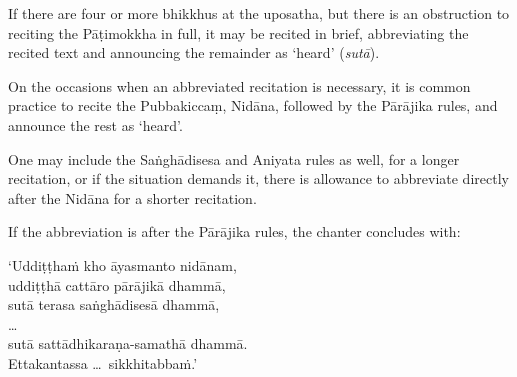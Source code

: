 If there are four or more bhikkhus at the uposatha, but there is an obstruction
to reciting the Pāṭimokkha in full, it may be recited in brief, abbreviating the
recited text and announcing the remainder as `heard' (\emph{sutā}).

On the occasions when an abbreviated recitation is necessary, it is common
practice to recite the Pubbakiccaṃ, Nidāna, followed by the Pārājika rules, and
announce the rest as `heard'.

One may include the Saṅghādisesa and Aniyata rules as well, for a longer
recitation, or if the situation demands it, there is allowance to abbreviate
directly after the Nidāna for a shorter recitation.

If the abbreviation is after the Pārājika rules, the chanter concludes with:

`Uddiṭṭhaṁ kho āyasmanto nidānam,\\
uddiṭṭhā cattāro pārājikā dhammā,\\
sutā terasa saṅghādisesā dhammā,\\
\ldots\\
sutā sattādhikaraṇa-samathā dhammā.\\
Ettakantassa \ldots\ sikkhitabbaṁ.'


